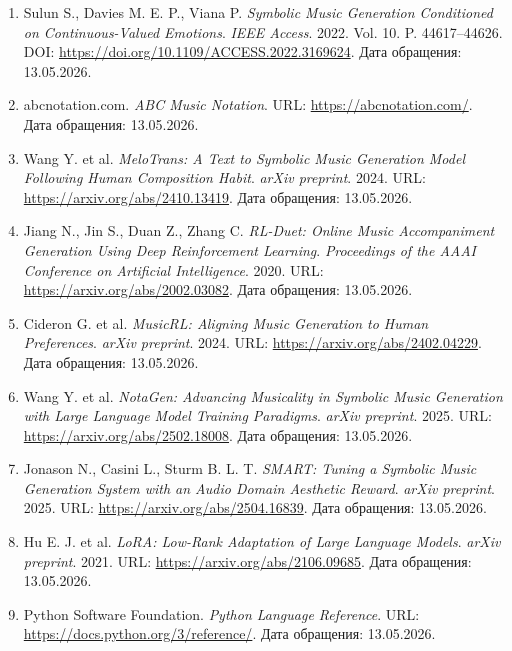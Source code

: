 \documentclass[a4paper,12pt]{extarticle}
\begin{document}
\begin{enumerate}
\item \label{ref:sulun2022emotion} Sulun S., Davies M. E. P., Viana P. \textit{Symbolic Music Generation Conditioned on Continuous-Valued Emotions}. \textit{IEEE Access}. 2022. Vol. 10. P. 44617--44626. DOI: \url{https://doi.org/10.1109/ACCESS.2022.3169624}. Дата обращения: 13.05.2026.

\item \label{ref:abcnotation2026} abcnotation.com. \textit{ABC Music Notation}. URL: \url{https://abcnotation.com/}. Дата обращения: 13.05.2026.

\item \label{ref:melotrans2024} Wang Y. et al. \textit{MeloTrans: A Text to Symbolic Music Generation Model Following Human Composition Habit}. \textit{arXiv preprint}. 2024. URL: \url{https://arxiv.org/abs/2410.13419}. Дата обращения: 13.05.2026.

\item \label{ref:rlduet2020} Jiang N., Jin S., Duan Z., Zhang C. \textit{RL-Duet: Online Music Accompaniment Generation Using Deep Reinforcement Learning}. \textit{Proceedings of the AAAI Conference on Artificial Intelligence}. 2020. URL: \url{https://arxiv.org/abs/2002.03082}. Дата обращения: 13.05.2026.

\item \label{ref:musicrl2024} Cideron G. et al. \textit{MusicRL: Aligning Music Generation to Human Preferences}. \textit{arXiv preprint}. 2024. URL: \url{https://arxiv.org/abs/2402.04229}. Дата обращения: 13.05.2026.

\item \label{ref:notagen2025} Wang Y. et al. \textit{NotaGen: Advancing Musicality in Symbolic Music Generation with Large Language Model Training Paradigms}. \textit{arXiv preprint}. 2025. URL: \url{https://arxiv.org/abs/2502.18008}. Дата обращения: 13.05.2026.

\item \label{ref:smart2025} Jonason N., Casini L., Sturm B. L. T. \textit{SMART: Tuning a Symbolic Music Generation System with an Audio Domain Aesthetic Reward}. \textit{arXiv preprint}. 2025. URL: \url{https://arxiv.org/abs/2504.16839}. Дата обращения: 13.05.2026.

\item \label{ref:hu2021lora} Hu E. J. et al. \textit{LoRA: Low-Rank Adaptation of Large Language Models}. \textit{arXiv preprint}. 2021. URL: \url{https://arxiv.org/abs/2106.09685}. Дата обращения: 13.05.2026.

\item \label{ref:python2026} Python Software Foundation. \textit{Python Language Reference}. URL: \url{https://docs.python.org/3/reference/}. Дата обращения: 13.05.2026.


\end{enumerate}
\end{document}
